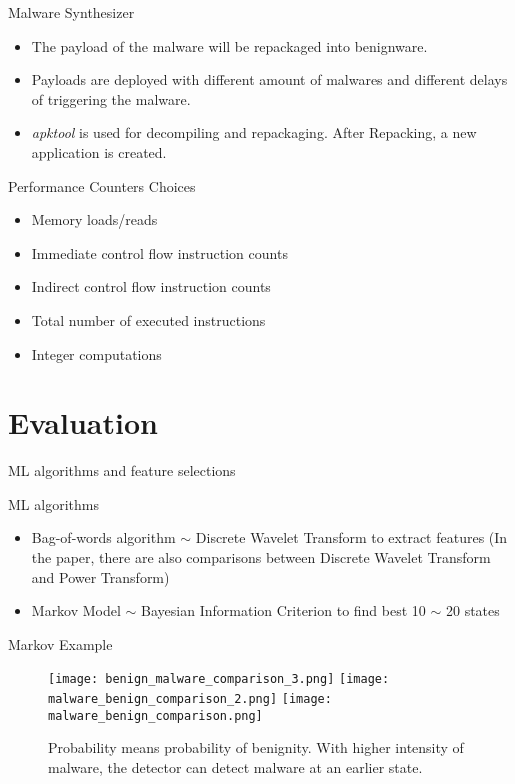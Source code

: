 \documentclass{beamer}
\begin{document}
\begin{frame}{Malware Synthesizer}
	\begin{itemize}
		\item The payload of the malware will be repackaged into benignware.
		\item Payloads are deployed with different amount of malwares and
			different delays of triggering the malware.
		\item \textit{apktool} is used for decompiling and repackaging. After 
			Repacking, a new application is created.
	\end{itemize}
\end{frame}

\begin{frame}{Performance Counters Choices}
	\begin{itemize}
		\item Memory loads/reads
		\item Immediate control flow instruction counts
		\item Indirect control flow instruction counts
		\item Total number of executed instructions
		\item Integer computations 
	\end{itemize}
\end{frame}

\section{Evaluation}

\begin{frame}{ML algorithms and feature selections}
	\begin{block}{ML algorithms}
		\begin{itemize}
			\item Bag-of-words algorithm $\sim$ Discrete Wavelet Transform to
			extract features (In the paper, there are also comparisons between Discrete
			Wavelet Transform and Power Transform)
			\item Markov Model $\sim$ Bayesian Information Criterion to find
				best 10 $\sim$ 20 states
		\end{itemize}
	\end{block}
\end{frame}

\begin{frame}{Markov Example}

	\begin{figure}
		\centering
		\texttt{[image: benign\_malware\_comparison\_3.png]}
		\texttt{[image: malware\_benign\_comparison\_2.png]}
		\texttt{[image: malware\_benign\_comparison.png]}
		\caption{Probability means probability of benignity. With higher intensity 
			of malware, the detector can detect malware at an earlier state.}
	\end{figure}

\end{frame}
\end{document}
